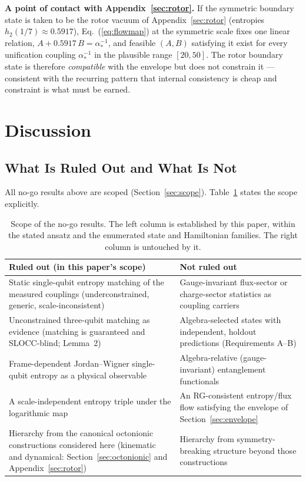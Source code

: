 \documentclass[11pt]{article}
\begin{document}
\textbf{A point of contact with Appendix~\ref{sec:rotor}.} If the symmetric boundary state is taken to be the rotor vacuum of Appendix~\ref{sec:rotor} (entropies $h_2(1/7) \approx 0.5917$), Eq.~(\ref{eq:flowmap}) at the symmetric scale fixes one linear relation, $A + 0.5917\,B = \alpha_*^{-1}$, and feasible $(A, B)$ satisfying it exist for every unification coupling $\alpha_*^{-1}$ in the plausible range $[20, 50]$. The rotor boundary state is therefore \emph{compatible} with the envelope but does not constrain it --- consistent with the recurring pattern that internal consistency is cheap and constraint is what must be earned.

\section{Discussion}
\label{sec:discussion}

\subsection{What Is Ruled Out and What Is Not}
\label{sec:notruledout}

All no-go results above are scoped (Section~\ref{sec:scope}). Table~\ref{tab:notruledout} states the scope explicitly.

\begin{table}[ht]
\centering
\begin{tabular}{p{6.6cm}|p{6.6cm}}
\hline
\textbf{Ruled out (in this paper's scope)} & \textbf{Not ruled out} \\
\hline
Static single-qubit entropy matching of the measured couplings (underconstrained, generic, scale-inconsistent) & Gauge-invariant flux-sector or charge-sector statistics as coupling carriers \\
\hline
Unconstrained three-qubit matching as evidence (matching is guaranteed and SLOCC-blind; Lemma~2) & Algebra-selected states with independent, holdout predictions (Requirements A--B) \\
\hline
Frame-dependent Jordan--Wigner single-qubit entropy as a physical observable & Algebra-relative (gauge-invariant) entanglement functionals \\
\hline
A scale-independent entropy triple under the logarithmic map & An RG-consistent entropy/flux flow satisfying the envelope of Section~\ref{sec:envelope} \\
\hline
Hierarchy from the canonical octonionic constructions considered here (kinematic and dynamical: Section~\ref{sec:octonionic} and Appendix~\ref{sec:rotor}) & Hierarchy from symmetry-breaking structure beyond those constructions \\
\hline
\end{tabular}
\caption{Scope of the no-go results. The left column is established by this paper, within the stated ansatz and the enumerated state and Hamiltonian families. The right column is untouched by it.}
\label{tab:notruledout}
\end{table}
\end{document}
